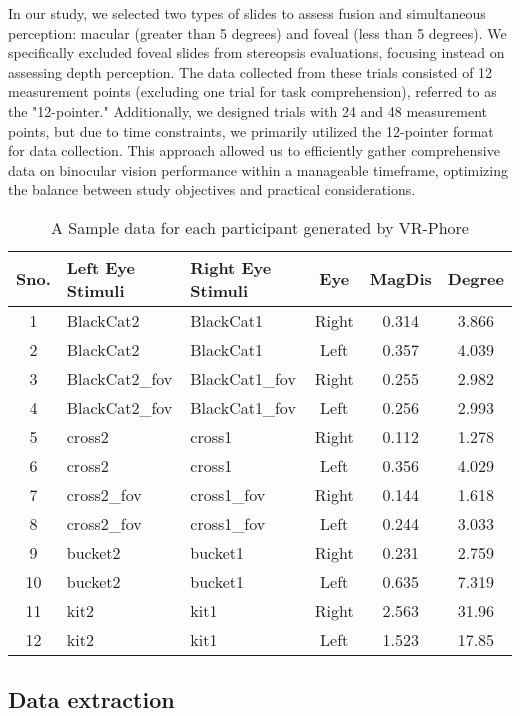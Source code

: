 \documentclass{article}
\begin{document}
In our study, we selected two types of slides to assess fusion and simultaneous perception: macular (greater than 5 degrees) and foveal (less than 5 degrees). We specifically excluded foveal slides from stereopsis evaluations, focusing instead on assessing depth perception. The data collected from these trials consisted of 12 measurement points (excluding one trial for task comprehension), referred to as the "12-pointer." Additionally, we designed trials with 24 and 48 measurement points, but due to time constraints, we primarily utilized the 12-pointer format for data collection. This approach allowed us to efficiently gather comprehensive data on binocular vision performance within a manageable timeframe, optimizing the balance between study objectives and practical considerations.


\begin{table}[h!]
\centering
\begin{tabular}{|c|l|l|c|c|c|}
\hline
\textbf{Sno.} & \textbf{Left Eye Stimuli} & \textbf{Right Eye Stimuli} & \textbf{Eye} & \textbf{MagDis} & \textbf{Degree} \\ \hline
1 & BlackCat2 & BlackCat1 & Right & 0.314 & 3.866 \\ \hline
2 & BlackCat2 & BlackCat1 & Left & 0.357 & 4.039 \\ \hline
3 & BlackCat2\_fov & BlackCat1\_fov & Right & 0.255 & 2.982 \\ \hline
4 & BlackCat2\_fov & BlackCat1\_fov & Left & 0.256 & 2.993 \\ \hline
5 & cross2 & cross1 & Right & 0.112 & 1.278 \\ \hline
6 & cross2 & cross1 & Left & 0.356 & 4.029 \\ \hline
7 & cross2\_fov & cross1\_fov & Right & 0.144 & 1.618 \\ \hline
8 & cross2\_fov & cross1\_fov & Left & 0.244 & 3.033 \\ \hline
9 & bucket2 & bucket1 & Right & 0.231 & 2.759 \\ \hline
10 & bucket2 & bucket1 & Left & 0.635 & 7.319 \\ \hline
11 & kit2 & kit1 & Right & 2.563 & 31.96 \\ \hline
12 & kit2 & kit1 & Left & 1.523 & 17.85 \\ \hline
\end{tabular}
\caption{A Sample data for each participant generated by VR-Phore}
\label{table:example}
\end{table}

\subsection{Data extraction}
\end{document}

